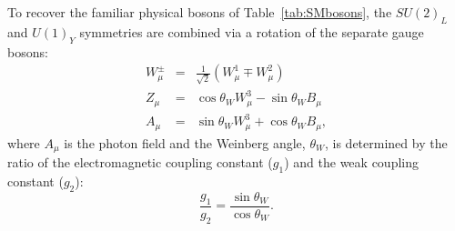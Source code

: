 To recover the familiar physical bosons of Table~\ref{tab:SMbosons}, the $SU(2)_{L}$ and $U(1)_{Y}$ symmetries are combined via a rotation of the separate gauge bosons:
%
\begin{eqnarray}
W^{\pm}_{\mu} &=& \frac{1}{\sqrt{2}}(W^{1}_{\mu} \mp W^{2}_{\mu}) \\
Z_{\mu} &=& \cos\theta_{W} W^{3}_{\mu} - \sin\theta_{W} B_{\mu} \\
A_{\mu} &=& \sin\theta_{W} W^{3}_{\mu} + \cos\theta_{W} B_{\mu}, 
\end{eqnarray}
where $A_{\mu}$ is the photon field 
and the Weinberg angle, $\theta_{W}$, is determined by the ratio of the electromagnetic coupling constant ($g_{1}$) and the weak coupling constant ($g_{2}$):
%
\begin{equation}
\frac{g_{1}}{g_{2}} = \frac{\sin \theta_{W}}{\cos \theta_{W}}.
\end{equation}


